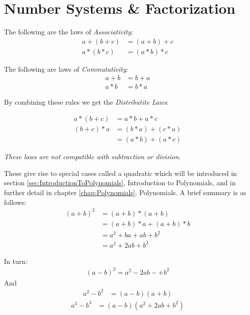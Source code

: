 \chapter{Number Systems \& Factorization}
\label{sec:NumberSystemsAndFactorization}
The following are the laws of \emph{Associativity}:
\begin{align}
  a + (b + c) & = (a+ b) + c \label{eq:assoc0}\\
  a * (b * c) & = (a * b) * c \label{eq:assoc1}
\end{align}


The following are laws of \emph{Commutativity}:
\begin{align}
  a + b & = b + a \label{eq:commut0} \\
  a * b & = b * a \label{eq:commut1}
\end{align}

By combining these rules we get the \emph{Distributite Laws}:

\begin{align}
      a* (b+c) & = a*b + a*c \label{eq:distrib0} \\
   (b+c) * a & = (b * a) + (c * a) \label{eq:distrib1} \\
    & = (a*b) + (a * c) \label{eq:distrib2}
\end{align}

\emph{These laws are not compatible with subtraction or division}.

These give rise to special cases called a quadratic which will be introduced in
section \ref{sec:IntroductionToPolynomials}, Introduction to Polynomials, and in
further detail in chapter \ref{chap:Polynomials}, Polynomials. A brief summary
is as follows:
\begin{align}
  (a + b)^2 & = (a+b)*(a+b) \\
   & = (a+b) * a + (a+b)* b \\
   & = a^2 + ba + ab + b^2 \\
   & = a^2 + 2ab + b^2
\end{align}

In turn:
\begin{align}
  (a-b)^2 = a^2 - 2ab - +b^2
\end{align} 
And
\begin{align}
  a^2 - b^2 & = (a-b)(a+b)
\end{align}
\begin{align}
  a^3 - b^3 & =(a-b)(a^2+2ab+b^2)
\end{align}


